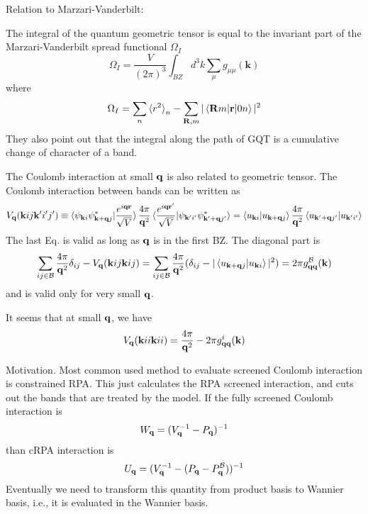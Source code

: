 \documentclass[onecolumn, prb,preprintnumbers,amsmath,amssymb,floatfix]{revtex4}
\renewcommand{\vr}{{\mathbf{r}}}
\newcommand{\vk}{{\mathbf{k}}}
\newcommand{\cb}{{\cal B}}
\begin{document}
Relation to Marzari-Vanderbilt:

The integral of the quantum geometric tensor is equal to the
invariant part of the Marzari-Vanderbilt spread functional $\Omega_{I}$
\begin{equation}
\Omega_I = \frac{V}{(2\pi)^3}\int_{BZ}d^3k\sum_\mu g_{\mu\mu}(\vk)
\end{equation}
where
\begin{equation}
\Omega_I = \sum_n \braket{r^2}_n - \sum_{\vR,m}|\braket{\vR m|\vr|0 n}|^2
\end{equation}  
They also point out that the integral along the path of GQT is a cumulative change of character of a band.


The Coulomb interaction at small ${\mathbf{q}}$ is also related to geometric tensor. The Coulomb interaction between bands can be written as
\begin{eqnarray}
V_\vq(\vk i j \vk' i'j') \equiv \braket{\psi_{\vk i}\psi^*_{\vk+\vq j} |\frac{e^{i\vq \vr}}{\sqrt{V}}}  \frac{4\pi}{\vq^2}
\braket{\frac{e^{i\vq \vr'}}{\sqrt{V}}|\psi_{\vk' i'}\psi^*_{\vk'+\vq j'} } =\braket{u_{\vk i}|u_{\vk+\vq j}}  \frac{4\pi}{\vq^2}
\braket{u_{\vk'+\vq j'} |u_{\vk' i'}} 
\end{eqnarray}
The last Eq. is valid as long as ${\mathbf{q}}$ is in the first BZ.
The diagonal part is
\begin{eqnarray}
 \sum_{ij\in \cb} \frac{4\pi}{\vq^2}\delta_{ij}-V_\vq(\vk i j \vk i j) = \sum_{ij\in \cb} \frac{4\pi}{\vq^2}(\delta_{ij}-
|\braket{u_{\vk+\vq j} |u_{\vk i}}|^2)=2\pi g^\cb_{\vq\vq}(\vk)
\end{eqnarray}  
and is valid only for very small ${\mathbf{q}}$.

It seems that at small ${\mathbf{q}}$, we have
\begin{eqnarray}
V_\vq(\vk i i \vk i i)   = \frac{4\pi}{\vq^2}-2\pi g^i_{\vq\vq}(\vk)
\end{eqnarray}

Motivation. Most common used method to evaluate screened Coulomb interaction is constrained RPA. This just calculates the RPA screened interaction, and cuts out the bands that are treated by the model. If the fully screened Coulomb interaction is
$$W_{{\mathbf{q}}} = (V_{\mathbf{q}}^{-1}- P_{{\mathbf{q}}})^{-1}$$
than cRPA interaction is
$$U_{\vq} = (V_\vq^{-1}-(P_{\vq}-P_{\vq}^\cb))^{-1}$$
Eventually we need to transform this quantity from product basis to Wannier basis, i.e., it is evaluated in the Wannier basis.
\end{document}
